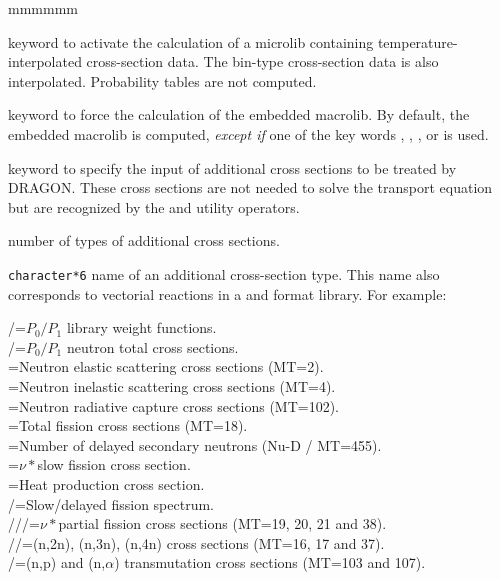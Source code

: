 \begin{ListeDeDescription}{mmmmmm}
\item[\moc{NEWL}] keyword to activate the calculation of a microlib
containing temperature-interpo\-la\-ted cross-section data. The bin-type
cross-section data is also interpolated. Probability tables are not computed.

\item[\moc{MACR}] keyword to force the calculation of the embedded
macrolib. By default, the embedded macrolib is computed, {\sl except if} one of the
key words , , ,  or  is used.

\item[\moc{ADED}] keyword to specify the input of additional cross sections to
be treated by DRAGON. These cross sections are not needed to solve the transport
equation but are recognized by the  and utility operators.

\item[\dusa{nedit}] number of types of additional cross sections.

\item[\dusa{HEDIT}] {\tt character*6} name of an additional
cross-section type. This name also corresponds to vectorial reactions in a
 and
 format library. For example:

/=$P_0/P_1$ library weight functions.\\
/=$P_0/P_1$ neutron total cross sections.\\
=Neutron elastic scattering cross sections (MT=2).\\
=Neutron inelastic scattering cross sections (MT=4).\\
=Neutron radiative capture cross sections (MT=102).\\
=Total fission cross sections (MT=18).\\
=Number of delayed secondary neutrons (Nu-D / MT=455).\\
=$\nu*$slow fission cross section.\\
=Heat production cross section.\\
/=Slow/delayed fission spectrum.\\
///=$\nu*$partial fission cross sections (MT=19, 20, 21 and 38).\\ 
//=(n,2n), (n,3n), (n,4n) cross sections (MT=16, 17 and 37).\\
/=(n,p) and (n,$\alpha$) transmutation cross sections (MT=103 and 107).


\end{ListeDeDescription}

